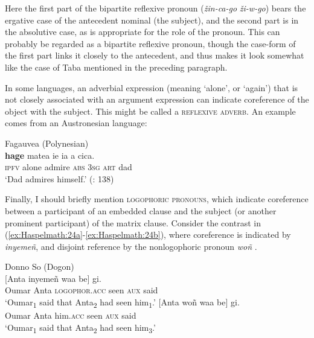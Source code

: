 \documentclass[output=paper]{langscibook}
\begin{document}
Here the first part of the bipartite reflexive pronoun (\textit{žin-ca-go} \textit{ži-w-go}) bears the ergative case of the antecedent nominal (the subject), and the second part is in the absolutive case, as is appropriate for the role of the pronoun. This can probably be regarded as a bipartite reflexive pronoun, though the case-form of the first part links it closely to the antecedent, and thus makes it look somewhat like the case of Taba mentioned in the preceding paragraph.

In some languages, an adverbial expression (meaning ‘alone’, or ‘again’) that is not closely associated with an argument expression can indicate coreference of the object with the subject. This might be called a \textsc{reflexive} \textsc{adverb}. An example comes from an Austronesian language:

\ea Fagauvea (Polynesian)
    \label{ex:Haspelmath:23}\\
      \textbf{{hage}}  {matea}  {ie}  {ia}  {a}  {cica.}\\
     \textsc{ipfv}  alone  admire  \textsc{abs}  \textsc{3sg}  \textsc{art}  dad     \\
    \glt‘Dad admires himself.’ (\citealt{Moyse-Faurie2008}: 138)
\z

 Finally, I should briefly mention \textsc{logophoric} \textsc{pronouns}, which indicate coreference between a participant of an embedded clause and the subject (or another prominent participant) of the matrix clause. Consider the contrast in (\ref{ex:Haspelmath:24a}-\ref{ex:Haspelmath:24b}), where coreference is indicated by \textit{inyemeñ}, and disjoint reference by the nonlogophoric pronoun \textit{woñ} \citep[1056]{Culy1994}.

\ea  Donno So (Dogon)
    \label{ex:Haspelmath:24}\\
    \ea \label{ex:Haspelmath:24a}
      {[Anta}  {inyemeñ}  {waa}  {be]}  {gi.}\\
        Oumar  Anta  \textsc{logophor.acc}  seen  \textsc{aux}  said \\
    \glt ‘Oumar\textsubscript{1} said that Anta\textsubscript{2} had seen him\textsubscript{1}.’
     \ex \label{ex:Haspelmath:24b}
      {[Anta}  {woñ}  {waa}  {be]}  {gi.}\\
       Oumar  Anta  him.\textsc{acc}  seen  \textsc{aux}  said  \\
    \glt  ‘Oumar\textsubscript{1} said that Anta\textsubscript{2} had seen him\textsubscript{3}.’
\z
\z 
     
\end{document}
